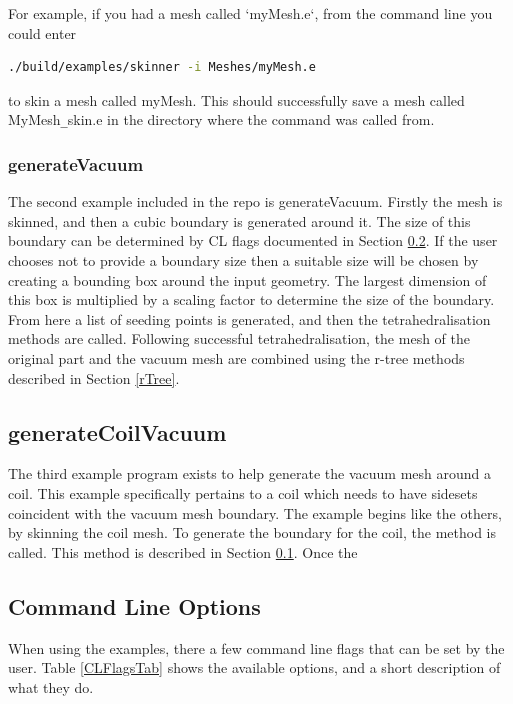 \documentclass[12pt, letterpaper]{article}
\begin{document}
For example, if you had a mesh called `myMesh.e`, from the command line you could enter 
\begin{lstlisting}[language=bash]
	./build/examples/skinner -i Meshes/myMesh.e
\end{lstlisting}
to skin a mesh called myMesh. This should successfully save a mesh called MyMesh\verb|_|skin.e in the directory where the command was called from. 

\subsubsection{generateVacuum}
The second example included in the repo is generateVacuum. Firstly the mesh is skinned, and then a cubic boundary is generated around it. The size of this boundary can be determined by CL flags documented in Section \ref{CLFlags}. If the user chooses not to provide a boundary size then a suitable size will be chosen by creating a bounding box around the input geometry. The largest dimension of this box is multiplied by a scaling factor to determine the size of the boundary. From here a list of seeding points is generated, and then the tetrahedralisation methods are called. Following successful tetrahedralisation, the mesh of the original part and the vacuum mesh are combined using the r-tree methods described in Section \ref{rTree}.

\subsection{generateCoilVacuum}
The third example program exists to help generate the vacuum mesh around a coil. This example specifically pertains to a coil which needs to have sidesets coincident with the vacuum mesh boundary. The example begins like the others, by skinning the coil mesh. To generate the boundary for the coil, the  method is called. This method is described in Section \ref{}. Once the 


\subsection{Command Line Options} \label{CLFlags}
When using the examples, there a few command line flags that can be set by the user. Table \ref{CLFlagsTab} shows the available options, and a short description of what they do.
\end{document}
